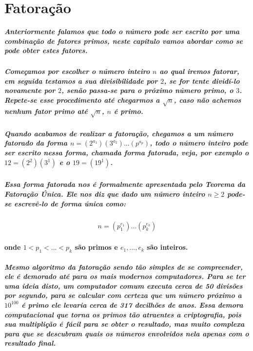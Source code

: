 \section{Fatora\c{c}\~{a}o}

\subparagraph{
Anteriormente falamos que todo o n\'umero pode ser escrito por uma combina\c{c}\~ao de fatores primos, neste cap\'itulo vamos abordar como se pode obter estes fatores.
}
\subparagraph{
Come\c{c}amos por escolher o n\'umero inteiro $n$ ao qual iremos fatorar, em seguida testamos a sua divisibilidade por $2$, se for tente divid\'i-lo novamente por $2$, sen\~ao passa-se para o pr\'oximo n\'umero primo, o $3$. Repete-se esse procedimento at\'e chegarmos a $\sqrt{n}$, caso n\~ao achemos nenhum fator primo at\'e $\sqrt{n}$, $n$ \'e primo.
}
\subparagraph{
Quando acabamos de realizar a fatora\c{c}\~ao, chegamos a um n\'umero fatorado da forma $n = (2^{a_{1}})(3^{a_{2}}) ... (p^{a_{p}})$, todo o n\'umero inteiro pode ser escrito nessa forma, chamada forma fatorada, veja, por exemplo o $12 = (2^2)(3^1)$ e o $19 = (19^1)$.
}
\subparagraph{
Essa forma fatorada nos \'e formalmente apresentada pelo \textit{Teorema da Fatora\c{c}\~ao \'Unica}. Ele nos diz que dado um n\'umero inteiro $n\geq2$ pode-se escrev\^e-lo de forma \'unica como:
}
\[	
	\begin{array}{c}
		\textit{$n = (p^{e_{1}}_{1}) ... (p^{e_{k}}_{k}) $}
	\end{array}
\]
\paragraph{
onde $1 < p_1 < ... < p_k $ s\~ao primos e $e_1, ..., e_k$ s\~ao inteiros.
}
\subparagraph{
Mesmo algoritmo da fatora\c{c}\~ao sendo t\~ao simples de se compreender, ele \'e demorado at\'e para os mais modernos computadores. Para se ter uma ideia disto, um computador comum executa cerca de {50} divis\~oes por segundo, para se calcular com certeza que um n\'umero pr\'oximo a $10^{100}$ \'e primo ele levaria cerca de {317} decilh\~oes de anos. Essa demora computacional que torna os primos t\~ao atraentes a criptografia, pois sua multipli\c{c}\~ao \'e f\'acil para se obter o resultado, mas muito complexa para que se descubram quais os n\'umeros envolvidos nela apenas com o resultado final.
}

